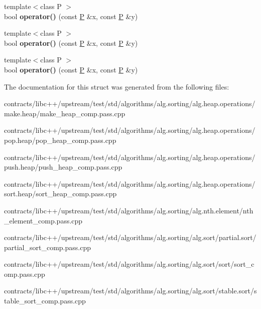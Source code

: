 \begin{DoxyCompactItemize}
{\footnotesize template$<$class P $>$ }\\bool {\bfseries operator()} (const \mbox{\hyperlink{struct_p}{P}} \&x, const \mbox{\hyperlink{struct_p}{P}} \&y)
\item 
\mbox{\label{structindirect__less_a1e9e685e691e16438cc36c9b06aa8386}} 
{\footnotesize template$<$class P $>$ }\\bool {\bfseries operator()} (const \mbox{\hyperlink{struct_p}{P}} \&x, const \mbox{\hyperlink{struct_p}{P}} \&y)
\item 
\mbox{\label{structindirect__less_a1e9e685e691e16438cc36c9b06aa8386}} 
{\footnotesize template$<$class P $>$ }\\bool {\bfseries operator()} (const \mbox{\hyperlink{struct_p}{P}} \&x, const \mbox{\hyperlink{struct_p}{P}} \&y)
\end{DoxyCompactItemize}


The documentation for this struct was generated from the following files\+:\begin{DoxyCompactItemize}
\item 
contracts/libc++/upstream/test/std/algorithms/alg.\+sorting/alg.\+heap.\+operations/make.\+heap/make\+\_\+heap\+\_\+comp.\+pass.\+cpp\item 
contracts/libc++/upstream/test/std/algorithms/alg.\+sorting/alg.\+heap.\+operations/pop.\+heap/pop\+\_\+heap\+\_\+comp.\+pass.\+cpp\item 
contracts/libc++/upstream/test/std/algorithms/alg.\+sorting/alg.\+heap.\+operations/push.\+heap/push\+\_\+heap\+\_\+comp.\+pass.\+cpp\item 
contracts/libc++/upstream/test/std/algorithms/alg.\+sorting/alg.\+heap.\+operations/sort.\+heap/sort\+\_\+heap\+\_\+comp.\+pass.\+cpp\item 
contracts/libc++/upstream/test/std/algorithms/alg.\+sorting/alg.\+nth.\+element/nth\+\_\+element\+\_\+comp.\+pass.\+cpp\item 
contracts/libc++/upstream/test/std/algorithms/alg.\+sorting/alg.\+sort/partial.\+sort/partial\+\_\+sort\+\_\+comp.\+pass.\+cpp\item 
contracts/libc++/upstream/test/std/algorithms/alg.\+sorting/alg.\+sort/sort/sort\+\_\+comp.\+pass.\+cpp\item 
contracts/libc++/upstream/test/std/algorithms/alg.\+sorting/alg.\+sort/stable.\+sort/stable\+\_\+sort\+\_\+comp.\+pass.\+cpp\end{DoxyCompactItemize}
